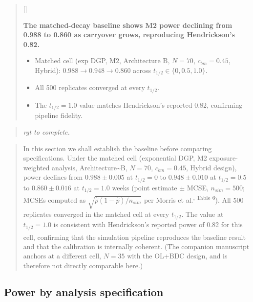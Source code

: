 \documentclass[
  11pt,
]{article}
\newcounter{pgraph}
\newenvironment{bullets}{%
  \stepcounter{pgraph}%
  \begin{quote}\small\sffamily\color[gray]{0.30}%
  {\normalfont\scriptsize\color[gray]{0.58}[\thepgraph]\enspace}}{%
  \end{quote}}
\newenvironment{rgt}{%
  \begin{quote}\small\itshape\color[RGB]{20,60,160}}{%
  \end{quote}}
\newenvironment{orig}{%
  \begin{quote}\normalsize\color[gray]{0.55}}{%
  \end{quote}}
\begin{document}
\begin{bullets}

\textbf{The matched-decay baseline shows M2 power declining from
0.988 to 0.860 as carryover grows, reproducing Hendrickson's 0.82.}

\begin{itemize}\setlength{\itemsep}{2pt}\setlength{\parskip}{0pt}
\item Matched cell (exp DGP, M2, Architecture B, $N = 70$,
$c_{bm} = 0.45$, Hybrid): $0.988 \to 0.948 \to 0.860$ across
$t_{1/2} \in \{0, 0.5, 1.0\}$.
\item All 500 replicates converged at every $t_{1/2}$.
\item The $t_{1/2} = 1.0$ value matches Hendrickson's reported 0.82,
confirming pipeline fidelity.
\end{itemize}

\end{bullets}

\begin{rgt}
rgt to complete.

\end{rgt}

\begin{orig}
In this section we shall establish the baseline before comparing
specifications. Under the matched cell (exponential DGP, M2
exposure-weighted analysis, Architecture\textasciitilde B, \(N = 70\),
\(c_{bm} = 0.45\), Hybrid design), power declines from
\(0.988 \pm 0.005\) at \(t_{1/2} = 0\) to \(0.948 \pm 0.010\) at
\(t_{1/2} = 0.5\) to \(0.860 \pm 0.016\) at \(t_{1/2} = 1.0\) weeks
(point estimate \(\pm\) MCSE, \(n_{sim} = 500\); MCSEs
computed as \(\sqrt{\hat{p}(1-\hat{p})/n_{sim}}\) per Morris et
al.\textsuperscript{, Table 6}). All 500 replicates
converged in the matched cell at every \(t_{1/2}\). The value at
\(t_{1/2} = 1.0\) is consistent with Hendrickson's reported power of
0.82 for this cell\textsuperscript{}, confirming that the
simulation pipeline reproduces the baseline result and that the
calibration is internally coherent. (The companion manuscript
anchors at a different cell, \(N = 35\) with the OL+BDC design, and
is therefore not directly comparable here.)

\end{orig}

\subsection{Power by analysis specification}\label{power-by-analysis-specification}
\end{document}

